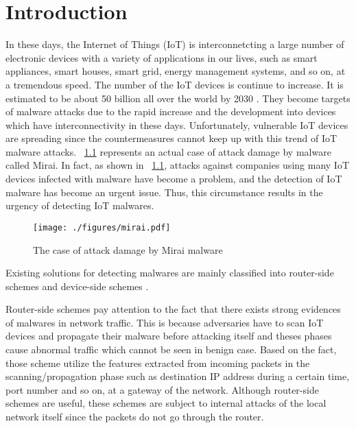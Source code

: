 \chapter{Introduction}\label{Sec:Introduction}

In these days, the Internet of Things (IoT) is interconnetcting a large number of electronic devices with a variety of applications in our lives, such as smart appliances, smart houses, smart grid, energy management systems, and so on, at a tremendous speed.
The number of the IoT devices is continue to increase.
It is estimated to be about 50 billion all over the world by 2030 \cite{bg1, bg2}.
They become targets of malware attacks due to the rapid increase and the development into devices which have interconnectivity in these days.
Unfortunately, vulnerable IoT devices are spreading since the countermeasures cannot keep up with this trend of IoT malware attacks.
\figurename~\ref{fig:mirai} represents an actual case of attack damage by malware called Mirai.
In fact, as shown in \figurename~\ref{fig:mirai}, attacks against companies using many IoT devices infected with malware have become a problem, and the detection of IoT malware has become an urgent issue.
Thus, this circumstance results in the urgency of detecting IoT malwares.

\begin{figure}[p]
 \centering
 \hspace{-55pt}
 \texttt{[image: ./figures/mirai.pdf]}
 \caption{The case of attack damage by Mirai malware} 
 \label{fig:mirai}
\end{figure}
\afterpage{\clearpage}
\newpage
Existing solutions for detecting malwares are mainly classified into router-side schemes \cite{net} and device-side schemes \cite{cfg}.

Router-side schemes pay attention to the fact that there exists strong evidences of malwares in network traffic.
This is because adversaries have to scan IoT devices and propagate their malware before attacking itself and theses phases cause abnormal traffic which cannot be seen in benign case.
Based on the fact, those scheme utilize the features extracted from incoming packets in the scanning/propagation phase such as destination IP address during a certain time, port number and so on, at a gateway of the network.
Although router-side schemes are useful, these schemes are subject to internal attacks of the local network itself since the packets do not go through the router.

